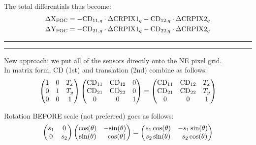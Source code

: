 \documentclass{article}
\begin{document}
The total differentials thus become:
\begin{align}
   \Delta \mathrm{X}_{\mathrm{FOC}} &= -\mathrm{CD}_{11,q} \cdot \Delta \mathrm{CRPIX1}_q - \mathrm{CD}_{12,q} \cdot \Delta \mathrm{CRPIX2}_q \\
   \Delta \mathrm{Y}_{\mathrm{FOC}} &= -\mathrm{CD}_{21,q} \cdot \Delta \mathrm{CRPIX1}_q - \mathrm{CD}_{22,q} \cdot \Delta \mathrm{CRPIX2}_q
\end{align}

\hrule
\vspace{2mm}
\hrule
\vspace{5mm}

\pagebreak

New approach: we put all of the sensors directly onto the NE pixel grid.
\\

In matrix form, CD (1st) and translation (2nd) combine as follows:
\begin{align*}
   \begin{pmatrix}
      1 & 0 & T_x \\
      0 & 1 & T_y \\
      0 & 0 & 1
   \end{pmatrix}
   \begin{pmatrix}
      \mathrm{CD}_{11} & \mathrm{CD}_{12} & 0 \\
      \mathrm{CD}_{21} & \mathrm{CD}_{22} & 0 \\
         0     &    0     & 1
   \end{pmatrix}
   =
   \begin{pmatrix}
      \mathrm{CD}_{11} & \mathrm{CD}_{12} & T_x \\
      \mathrm{CD}_{21} & \mathrm{CD}_{22} & T_y \\
         0     &    0     & 1
   \end{pmatrix}
\end{align*}

Rotation BEFORE scale (not preferred) goes as follows:
\begin{align*}
   \begin{pmatrix}
         s_1 &  0   \\
         0   & s_2 
   \end{pmatrix}
   \begin{pmatrix}
      \mathrm{cos}(\theta)   &    -\mathrm{sin}(\theta)   \\
      \mathrm{sin}(\theta)   & \;\;\mathrm{cos}(\theta) 
   \end{pmatrix}
   =
   \begin{pmatrix}
      s_1 \, \mathrm{cos}(\theta)   &     -s_1 \, \mathrm{sin}(\theta)   \\
      s_2 \, \mathrm{sin}(\theta)   & \;\; s_2 \, \mathrm{cos}(\theta) 
   \end{pmatrix}
\end{align*}
\end{document}
